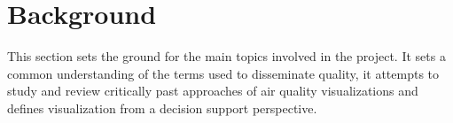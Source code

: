 \chapter{Background}
This section sets the ground for the main topics involved in the project. It sets a common understanding of the terms used to disseminate quality, it attempts to study and review critically past approaches of air quality visualizations and defines visualization from a decision support perspective.






